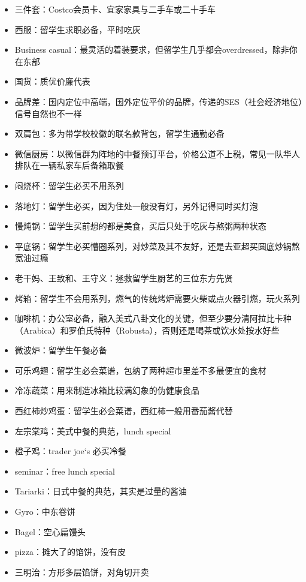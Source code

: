 \documentclass[]{tufte-book}
\providecommand{\tightlist}{%
  \setlength{\itemsep}{0pt}\setlength{\parskip}{0pt}}
\begin{document}
\begin{itemize}
\tightlist
\item
  三件套：Costco会员卡、宜家家具与二手车或二十手车
\item
  西服：留学生求职必备，平时吃灰
\item
  Business casual：最灵活的着装要求，但留学生几乎都会overdressed，除非你在东部
\item
  国货：质优价廉代表
\item
  品牌差：国内定位中高端，国外定位平价的品牌，传递的SES（社会经济地位）信号自然也不一样
\item
  双肩包：多为带学校校徽的联名款背包，留学生通勤必备
\item
  微信厨房：以微信群为阵地的中餐预订平台，价格公道不上税，常见一队华人排队在一辆私家车后备箱取餐
\item
  闷烧杯：留学生必买不用系列
\item
  落地灯：留学生必买，因为住处一般没有灯，另外记得同时买灯泡
\item
  慢炖锅：留学生买前想的都是美食，买后只处于吃灰与熬粥两种状态
\item
  平底锅：留学生必买懵圈系列，对炒菜及其不友好，还是去亚超买圆底炒锅熬宽油过瘾
\item
  老干妈、王致和、王守义：拯救留学生厨艺的三位东方先贤
\item
  烤箱：留学生不会用系列，燃气的传统烤炉需要火柴或点火器引燃，玩火系列
\item
  咖啡机：办公室必备，融入美式八卦文化的关键，但至少要分清阿拉比卡种（Arabica）和罗伯氏特种（Robusta），否则还是喝茶或饮水处按水好些
\item
  微波炉：留学生午餐必备
\item
  可乐鸡翅：留学生必会菜谱，包纳了两种超市里差不多最便宜的食材
\item
  冷冻蔬菜：用来制造冰箱比较满幻象的伪健康食品
\item
  西红柿炒鸡蛋：留学生必会菜谱，西红柿一般用番茄酱代替
\item
  左宗棠鸡：美式中餐的典范，lunch special
\item
  橙子鸡：trader joe`s 必买冷餐
\item
  seminar：free lunch special
\item
  Tariarki：日式中餐的典范，其实是过量的酱油
\item
  Gyro：中东卷饼
\item
  Bagel：空心扁馒头
\item
  pizza：摊大了的馅饼，没有皮
\item
  三明治：方形多层馅饼，对角切开卖

\end{itemize}
\end{document}
